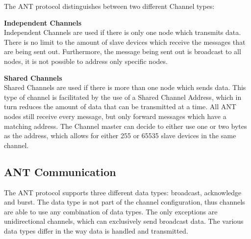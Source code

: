 The ANT protocol distinguishes between two different Channel types:
\begin{description}
\item{\textbf{Independent Channels}} \hfill \\ Independent Channels are used if there is only one node which transmits  data. There is no limit to the amount of slave devices which receive the messages that are being sent out. Furthermore, the message being sent out is broadcast to all nodes, it is not possible to address only specific nodes.
\item{\textbf{Shared Channels}} \hfill \\ Shared Channels are used if there is more than one node which sends data. This type of channel is facilitated by the use of a Shared Channel Address, which in turn reduces the amount of data that can be transmitted at a time. All ANT nodes still receive every message, but only forward messages which have a matching address. The Channel master can decide to either use one or two bytes as the address, which allows for either 255 or 65535 slave devices in the same channel. 
\end{description}

\subsection{ANT Communication}

The ANT protocol supports three different data types: broadcast, acknowledge and burst. The data type is not part of the channel configuration, thus channels are able to use any combination of data types. The only exceptions are unidirectional channels, which can exclusively send broadcast data. The various data types differ in the way data is handled and transmitted.

